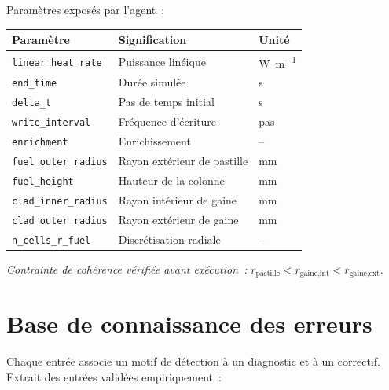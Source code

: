 \documentclass[12pt,a4paper,french]{report}
\begin{document}
\vspace{0.6cm}

\noindent Paramètres exposés par l'agent~:

\vspace{0.3cm}
\noindent
\begin{tabularx}{\textwidth}{@{}lXl@{}}
\toprule
\textbf{Paramètre} & \textbf{Signification} & \textbf{Unité}\\
\midrule
\texttt{linear\_heat\_rate} & Puissance linéique & \si{\watt\per\metre}\\
\texttt{end\_time} & Durée simulée & \si{\second}\\
\texttt{delta\_t} & Pas de temps initial & \si{\second}\\
\texttt{write\_interval} & Fréquence d'écriture & pas\\
\texttt{enrichment} & Enrichissement & --\\
\texttt{fuel\_outer\_radius} & Rayon extérieur de pastille & \si{\milli\metre}\\
\texttt{fuel\_height} & Hauteur de la colonne & \si{\milli\metre}\\
\texttt{clad\_inner\_radius} & Rayon intérieur de gaine & \si{\milli\metre}\\
\texttt{clad\_outer\_radius} & Rayon extérieur de gaine & \si{\milli\metre}\\
\texttt{n\_cells\_r\_fuel} & Discrétisation radiale & --\\
\bottomrule
\end{tabularx}

\vspace{0.4cm}
\noindent
\textit{Contrainte de cohérence vérifiée avant exécution~:}
$r_{\text{pastille}} < r_{\text{gaine,int}} < r_{\text{gaine,ext}}$.

\section{Base de connaissance des erreurs}
\label{ann:errkb}

\noindent Chaque entrée associe un motif de détection à un diagnostic et à un
correctif. Extrait des entrées validées empiriquement~:
\end{document}
